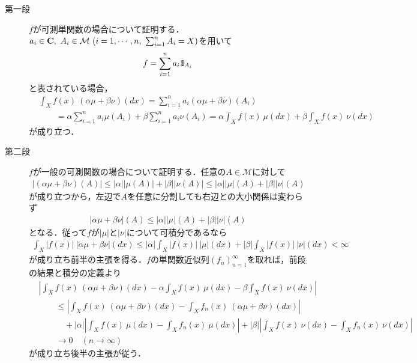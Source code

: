 	\begin{prf}
		\begin{description}
			\item[第一段]
				$f$が可測単関数の場合について証明する．
				$a_i \in \C,\ A_i \in \mathcal{M}\ (i=1,\cdots,n,\ \sum_{i=1}^{n} A_i = X)$を用いて
				\begin{align}
					f = \sum_{i=1}^{n} a_i \mbox{1}\hspace{-0.25em}\mbox{l}_{A_i}
				\end{align}
				と表されている場合，
				\begin{align}
					&\int_X f(x)\ (\alpha\mu + \beta\nu)(dx)
					= \sum_{i=1}^{n} a_i (\alpha\mu + \beta\nu)(A_i) \\
					&\qquad = \alpha \sum_{i=1}^{n} a_i \mu(A_i) + \beta \sum_{i=1}^{n} a_i \nu(A_i)
					= \alpha \int_X f(x)\ \mu(dx) + \beta \int_X f(x)\ \nu(dx)
				\end{align}
				が成り立つ．
				
			\item[第二段]
			$f$が一般の可測関数の場合について証明する．任意の$A \in \mathcal{M}$に対して
			\begin{align}
				\left| (\alpha \mu + \beta \nu)(A) \right| \leq |\alpha||\mu(A)| + |\beta||\nu(A)| \leq |\alpha||\mu|(A) + |\beta||\nu|(A)
 			\end{align}
 			が成り立つから，左辺で$A$を任意に分割しても右辺との大小関係は変わらず
 			\begin{align}
 				|\alpha \mu + \beta \nu|(A) \leq |\alpha||\mu|(A) + |\beta||\nu|(A)
 			\end{align}
 			となる．従って$f$が$|\mu|$と$|\nu|$について可積分であるなら
 			\begin{align}
 				\int_X |f(x)|\ |\alpha \mu + \beta \nu|(dx) \leq |\alpha| \int_X |f(x)|\ |\mu|(dx) + |\beta| \int_X |f(x)|\ |\nu|(dx) < \infty
 			\end{align}
 			が成り立ち前半の主張を得る．$f$の単関数近似列$(f_n)_{n=1}^{\infty}$を取れば，前段の結果と積分の定義より
 			\begin{align}
 				&\left| \int_X f(x)\ (\alpha\mu + \beta\nu)(dx) - \alpha \int_X f(x)\ \mu(dx) - \beta \int_X f(x)\ \nu(dx) \right| \\
 					&\qquad \leq \left| \int_X f(x)\ (\alpha\mu + \beta\nu)(dx) - \int_X f_n(x)\ (\alpha\mu + \beta\nu)(dx) \right| \\
 					&\qquad \quad + |\alpha| \left| \int_X f(x)\ \mu(dx) - \int_X f_n(x)\ \mu(dx) \right|
 					+ |\beta| \left| \int_X f(x)\ \nu(dx) - \int_X f_n(x)\ \nu(dx) \right| \\
 				&\qquad \longrightarrow 0 \quad (n \longrightarrow \infty)
 			\end{align}
 			が成り立ち後半の主張が従う．
 			\QED
		\end{description}
	\end{prf}
	
